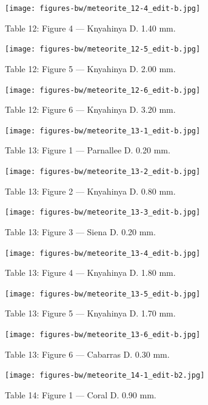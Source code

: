 \documentclass[a4paper, 12pt, oneside]{article}
\begin{document}
\clearpage
\begin{figure}[t]
\texttt{[image: figures-bw/meteorite\_12-4\_edit-b.jpg]}
\caption{Table 12: Figure 4 --- Knyahinya D. 1.40 mm.}
\centering
\end{figure}
\clearpage
\begin{figure}[t]
\texttt{[image: figures-bw/meteorite\_12-5\_edit-b.jpg]}
\caption{Table 12: Figure 5 --- Knyahinya D. 2.00 mm.}
\centering
\end{figure}
\clearpage
\begin{figure}[t]
\texttt{[image: figures-bw/meteorite\_12-6\_edit-b.jpg]}
\caption{Table 12: Figure 6 --- Knyahinya D. 3.20 mm.}
\centering
\end{figure}
\clearpage
{}
\begin{figure}[t]
\texttt{[image: figures-bw/meteorite\_13-1\_edit-b.jpg]}
\caption{Table 13: Figure 1 --- Parnallee D. 0.20 mm.}
\centering
\end{figure}
\clearpage
\begin{figure}[t]
\texttt{[image: figures-bw/meteorite\_13-2\_edit-b.jpg]}
\caption{Table 13: Figure 2 --- Knyahinya D. 0.80 mm.}
\centering
\end{figure}
\clearpage
\begin{figure}[t]
\texttt{[image: figures-bw/meteorite\_13-3\_edit-b.jpg]}
\caption{Table 13: Figure 3 --- Siena D. 0.20 mm.}
\centering
\end{figure}
\clearpage
\begin{figure}[t]
\texttt{[image: figures-bw/meteorite\_13-4\_edit-b.jpg]}
\caption{Table 13: Figure 4 --- Knyahinya D. 1.80 mm.}
\centering
\end{figure}
\clearpage
\begin{figure}[t]
\texttt{[image: figures-bw/meteorite\_13-5\_edit-b.jpg]}
\caption{Table 13: Figure 5 --- Knyahinya D. 1.70 mm.}
\centering
\end{figure}
\clearpage
\begin{figure}[t]
\texttt{[image: figures-bw/meteorite\_13-6\_edit-b.jpg]}
\caption{Table 13: Figure 6 --- Cabarras D. 0.30 mm.}
\centering
\end{figure}
\clearpage
{}
\begin{figure}[t]
\texttt{[image: figures-bw/meteorite\_14-1\_edit-b2.jpg]}
\caption{Table 14: Figure 1 --- Coral D. 0.90 mm.}
\centering
\end{figure}
\end{document}
